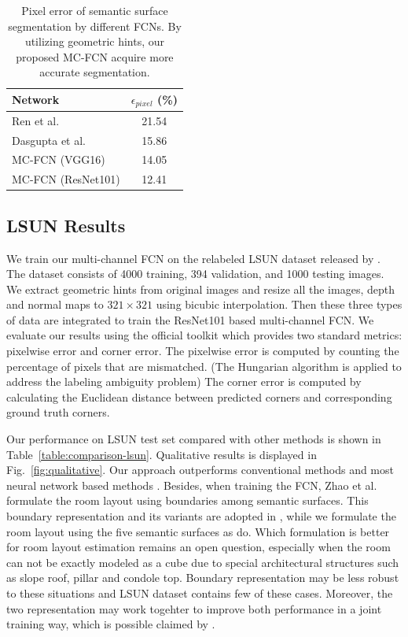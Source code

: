 \begin{table}
	\centering
	\begin{tabular}{lc}
		\toprule
		Network & $\epsilon_{pixel}$ (\%)\\
		\midrule
		Ren et al.~\cite{ren2016coarse} & 21.54 \\
		Dasgupta et al.~\cite{dasgupta2016delay} & 15.86 \\  
		\midrule
		MC-FCN (VGG16)  & 14.05 \\
		MC-FCN (ResNet101) & 12.41 \\
		\bottomrule
	\end{tabular}
	\caption{Pixel error of semantic surface segmentation by different FCNs. By utilizing geometric hints, our proposed MC-FCN acquire more accurate segmentation. }	
	\label{table:ablation}
\end{table}

\subsection{LSUN Results}
\label{sec:LSUN}
We train our multi-channel FCN on the relabeled LSUN dataset released by \cite{ren2016coarse}. The dataset consists of 4000 training, 394 validation, and 1000 testing images. We extract geometric hints from original images and resize all the images, depth and normal maps to $321\times321$ using bicubic interpolation. Then these three types of data are integrated to train the ResNet101 based multi-channel FCN. We evaluate our results using the official toolkit which provides two standard metrics: pixelwise error and corner error. The pixelwise error is computed by counting the percentage of pixels that are mismatched. (The Hungarian algorithm is applied to address the labeling ambiguity problem) The corner error is computed by calculating the Euclidean distance between predicted corners and corresponding ground truth corners.

Our performance on LSUN test set compared with other methods is shown in Table~\ref{table:comparison-lsun}. Qualitative results is displayed in Fig.~\ref{fig:qualitative}. Our approach outperforms conventional methods \cite{hedau2009recovering,mallya2015learning} and most neural network based methods  \cite{zhang2017learning,dasgupta2016delay,ren2016coarse,LeeRoomNet17}. 
%
Besides, when training the FCN, Zhao et al.~\cite{zhao2017physics} formulate the room layout using boundaries among semantic surfaces. This boundary representation and its variants are adopted in \cite{zhang2017learning,ren2016coarse}, while we formulate the room layout using the five semantic surfaces as \cite{dasgupta2016delay} do. 
%
Which formulation is better for room layout estimation remains an open question, especially when the room can not be exactly modeled as a cube due to special architectural structures such as slope roof, pillar and condole top. Boundary representation may be less robust to these situations and LSUN dataset contains few of these cases. Moreover, the two representation may work togehter to improve both performance in a joint training way, which is possible claimed by \cite{mallya2015learning,ren2016coarse}.



